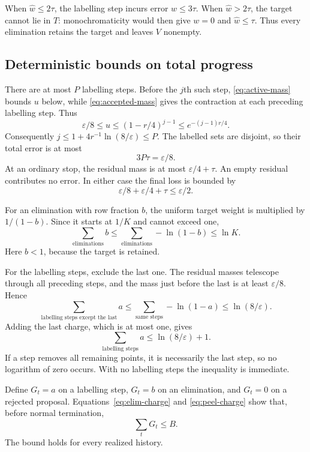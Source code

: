 \documentclass[11pt,letterpaper,pmlr,twoside]{jmlr}
\newcommand{\eps}{\varepsilon}
\begin{document}
When $\hat w\le2\tau$, the labelling step incurs error $w\le3\tau$. When $\hat w>2\tau$, the target cannot lie in $T$: monochromaticity would then give $w=0$ and $\hat w\le\tau$. Thus every elimination retains the target and leaves $V$ nonempty.

\subsection{Deterministic bounds on total progress}
There are at most $P$ labelling steps. Before the $j$th such step, \eqref{eq:active-mass} bounds $u$ below, while \eqref{eq:accepted-mass} gives the contraction at each preceding labelling step. Thus
\[
 \eps/8\le u\le(1-r/4)^{j-1}\le e^{-(j-1)r/4}.
\]
Consequently $j\le1+4r^{-1}\ln(8/\eps)\le P$. The labelled sets are disjoint, so their total error is at most
\begin{equation}
 3P\tau=\eps/8.
\label{eq:peel-error}
\end{equation}
At an ordinary stop, the residual mass is at most $\eps/4+\tau$. An empty residual contributes no error. In either case the final loss is bounded by
\begin{equation}
 \eps/8+\eps/4+\tau\le\eps/2.
\label{eq:normal-loss}
\end{equation}

For an elimination with row fraction $b$, the uniform target weight is multiplied by $1/(1-b)$. Since it starts at $1/K$ and cannot exceed one,
\begin{equation}
 \sum_{\text{eliminations}}b
 \le\sum_{\text{eliminations}}-\ln(1-b)
 \le\ln K.
\label{eq:elim-charge}
\end{equation}
Here $b<1$, because the target is retained.

For the labelling steps, exclude the last one. The residual masses telescope through all preceding steps, and the mass just before the last is at least $\eps/8$. Hence
\[
 \sum_{\text{labelling steps except the last}}a
 \le\sum_{\text{same steps}}-\ln(1-a)
 \le\ln(8/\eps).
\]
Adding the last charge, which is at most one, gives
\begin{equation}
 \sum_{\text{labelling steps}}a\le\ln(8/\eps)+1.
\label{eq:peel-charge}
\end{equation}
If a step removes all remaining points, it is necessarily the last step, so no logarithm of zero occurs. With no labelling steps the inequality is immediate.

Define $G_t=a$ on a labelling step, $G_t=b$ on an elimination, and $G_t=0$ on a rejected proposal. Equations~\eqref{eq:elim-charge} and \eqref{eq:peel-charge} show that, before normal termination,
\begin{equation}
 \sum_t G_t\le B.
\label{eq:total-charge}
\end{equation}
The bound holds for every realized history.
\end{document}

